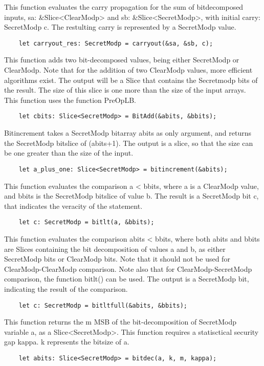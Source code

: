 This function evaluates the carry propagation for the sum of bitdecomposed inputs, sa: &Slice<ClearModp> and sb: &Slice<SecretModp>, with initial carry: SecretModp c.
The restulting carry is represented by a SecretModp value. 
\begin{lstlisting}
	let carryout_res: SecretModp = carryout(&sa, &sb, c);
\end{lstlisting}

This function adds two bit-decomposed values, being either SecretModp or ClearModp. Note that for the addition of two ClearModp values, more efficient algorithms exist.
The output will be a Slice that contains the Secretmodp bits of the result. The size of this slice is one more than the size of the input arrays.
This function uses the function PreOpLB.
\begin{lstlisting}
	let cbits: Slice<SecretModp> = BitAdd(&abits, &bbits);
\end{lstlisting}

Bitincrement takes a SecretModp bitarray abits as only argument, and returns the SecretModp bitslice of (abits+1). The output is a slice, so that the size can be one greater than the size of the input. 
\begin{lstlisting}
	let a_plus_one: Slice<SecretModp> = bitincrement(&abits);
\end{lstlisting}

This function evaluates the comparison a < bbits, where a is a ClearModp value, and bbits is the SecretModp bitslice of value b. The result is a SecretModp bit c, that indicates the veracity of the statement. 
\begin{lstlisting}
	let c: SecretModp = bitlt(a, &bbits);
\end{lstlisting}

This function evaluates the comparison abits < bbits, where both abits and bbits are Slices containing the bit decomposition of values a and b, as either SecretModp bits or ClearModp bits. 
Note that it should not be used for ClearModp-ClearModp comparison. Note also that for ClearModp-SecretModp comparison, the function bitlt() can be used.
The output is a SecretModp bit, indicating the result of the comparison.
\begin{lstlisting}
	let c: SecretModp = bitltfull(&abits, &bbits);
\end{lstlisting}

This function returns the m MSB of the bit-decomposition of SecretModp variable a, as a Slice<SecretModp>. 
This function requires a statisctical security gap kappa. k represents the bitsize of a.
\begin{lstlisting}
	let abits: Slice<SecretModp> = bitdec(a, k, m, kappa);
\end{lstlisting}

